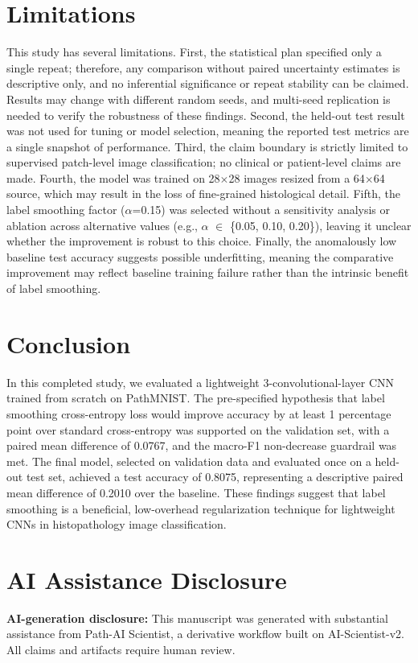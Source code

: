 \documentclass[10pt]{article}
\begin{document}
\section{Limitations}
This study has several limitations. First, the statistical plan specified only a single repeat; therefore, any comparison without paired uncertainty estimates is descriptive only, and no inferential significance or repeat stability can be claimed. Results may change with different random seeds, and multi-seed replication is needed to verify the robustness of these findings. Second, the held-out test result was not used for tuning or model selection, meaning the reported test metrics are a single snapshot of performance. Third, the claim boundary is strictly limited to supervised patch-level image classification; no clinical or patient-level claims are made. Fourth, the model was trained on 28\ensuremath{\times}28 images resized from a 64\ensuremath{\times}64 source, which may result in the loss of fine-grained histological detail. Fifth, the label smoothing factor (\ensuremath{\alpha}=0.15) was selected without a sensitivity analysis or ablation across alternative values (e.g., \ensuremath{\alpha} \ensuremath{\in} \{0.05, 0.10, 0.20\}), leaving it unclear whether the improvement is robust to this choice. Finally, the anomalously low baseline test accuracy suggests possible underfitting, meaning the comparative improvement may reflect baseline training failure rather than the intrinsic benefit of label smoothing.
\section{Conclusion}
In this completed study, we evaluated a lightweight 3-convolutional-layer CNN trained from scratch on PathMNIST. The pre-specified hypothesis that label smoothing cross-entropy loss would improve accuracy by at least 1 percentage point over standard cross-entropy was supported on the validation set, with a paired mean difference of 0.0767, and the macro-F1 non-decrease guardrail was met. The final model, selected on validation data and evaluated once on a held-out test set, achieved a test accuracy of 0.8075, representing a descriptive paired mean difference of 0.2010 over the baseline. These findings suggest that label smoothing is a beneficial, low-overhead regularization technique for lightweight CNNs in histopathology image classification.
\section{AI Assistance Disclosure}
\textbf{AI-generation disclosure:} This manuscript was generated with substantial assistance from Path-AI Scientist, a derivative workflow built on AI-Scientist-v2. All claims and artifacts require human review.
\FloatBarrier
\end{document}
